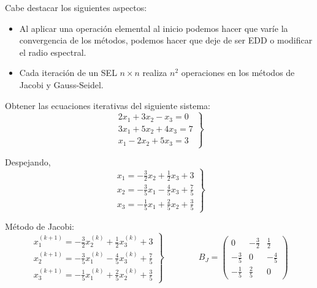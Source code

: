\begin{observacion} Cabe destacar los siguientes aspectos:
    \begin{itemize}
    \item Al aplicar una operación elemental al inicio podemos hacer que varíe la convergencia de los métodos, podemos
          hacer que deje de ser EDD o modificar el radio espectral.
    \item Cada iteración de un SEL $n\times n$ realiza $n^2$ operaciones en los métodos de Jacobi y Gauss-Seidel.
\end{itemize}
\end{observacion}

\begin{ejemplo}
Obtener las ecuaciones iterativas del siguiente sistema:
\begin{equation*}
    \left. \begin{array}{c}
        2x_1 + 3x_2 -x_3 = 0\\
        3x_1 + 5x_2 + 4x_3 = 7\\
        x_1-2x_2 + 5x_3 = 3
    \end{array}\right\}
\end{equation*}

Despejando,
\begin{equation*}
    \left. \begin{array}{c}
        \displaystyle x_1 = -\frac{3}{2} x_2 + \frac{1}{2}x_3 + 3 \\
        \displaystyle x_2 = -\frac{3}{5}x_1 - \frac{4}{5}x_3 + \frac{7}{5} \\
        \displaystyle x_3 = -\frac{1}{5}x_1 + \frac{2}{5}x_2 + \frac{3}{5}
    \end{array}\right\}
\end{equation*}

Método de Jacobi:
\begin{equation*}
    \left. \begin{array}{c}
        \displaystyle x_1^{(k+1)} = -\frac{3}{2} x_2^{(k)} + \frac{1}{2}x_3^{(k)} + 3 \\
        \displaystyle x_2^{(k+1)} = -\frac{3}{5}x_1^{(k)} - \frac{4}{5}x_3^{(k)} + \frac{7}{5} \\
        \displaystyle x_3^{(k+1)} = -\frac{1}{5}x_1^{(k)} + \frac{2}{5}x_2^{(k)} + \frac{3}{5}
    \end{array}\right\}
    \qquad \qquad
    B_J = \left( \begin{array}{ccc}
        0 & -\frac{3}{2} & \frac{1}{2} \\
        -\frac{3}{5} & 0 & -\frac{4}{5} \\
        -\frac{1}{5} & \frac{2}{5} & 0
    \end{array}\right)
\end{equation*}



\end{ejemplo}
